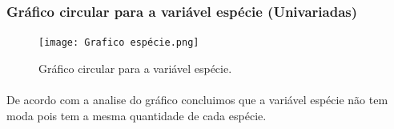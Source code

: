 \documentclass{article}
\begin{document}
\paragraph{}

\paragraph{}

\subsubsection{Gráfico circular para a variável espécie (Univariadas)}
\begin{figure}[h]
       \centering %
        \texttt{[image: Grafico espécie.png]}
       \caption{Gráfico circular para a variável espécie.}
       \label{fig:logo}
    \end{figure}
    
\paragraph{} De acordo com a analise do gráfico concluimos que a variável espécie não tem moda pois tem a mesma quantidade de cada espécie.

\paragraph{}

\paragraph{}

\paragraph{}

\paragraph{}

\paragraph{}

\paragraph{}
\end{document}
